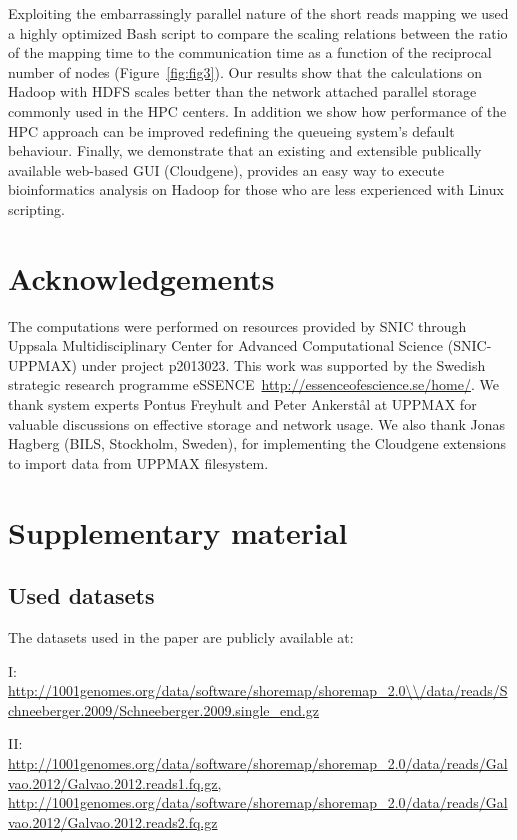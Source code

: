 \documentclass[11pt, oneside]{article}   	%
\begin{document}
Exploiting the embarrassingly parallel nature of the short reads mapping we used a highly optimized Bash script to compare the scaling relations between the ratio of the mapping time to the communication time as a function of the reciprocal number of nodes (Figure~\ref{fig:fig3}). 
Our results show that the calculations on Hadoop with HDFS scales better than the network attached parallel storage commonly used in the HPC centers.
In addition we show how performance of the HPC approach can be improved redefining the queueing system's default behaviour. Finally, we demonstrate that an existing and extensible publically available web-based GUI (Cloudgene), provides an easy way to execute bioinformatics analysis on Hadoop for those who are less experienced with Linux scripting.



\section{Acknowledgements}
The computations were performed on resources provided by SNIC through Uppsala Multidisciplinary Center for Advanced Computational Science (SNIC-UPPMAX) under project p2013023. This work was supported by the Swedish strategic research programme eSSENCE~\url{http://essenceofescience.se/home/}.
We thank system experts Pontus Freyhult and Peter Ankerst{\aa}l at UPPMAX for valuable discussions on effective storage and network usage. We also thank Jonas Hagberg (BILS, Stockholm, Sweden), for implementing the Cloudgene extensions to import data from UPPMAX filesystem.



\section{Supplementary material}

\subsection{Used datasets}

The datasets used in the paper are publicly available at:

I: \url{http://1001genomes.org/data/software/shoremap/shoremap\_2.0\\/data/reads/Schneeberger.2009/Schneeberger.2009.single\_end.gz}

II: \url{http://1001genomes.org/data/software/shoremap/shoremap\_2.0/data/reads/Galvao.2012/Galvao.2012.reads1.fq.gz, http://1001genomes.org/data/software/shoremap/shoremap\_2.0/data/reads/Galvao.2012/Galvao.2012.reads2.fq.gz}	
\end{document}
